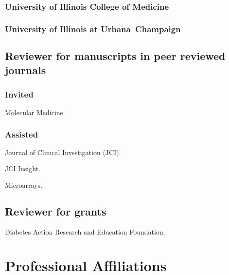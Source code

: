 \documentclass{komacv}
\begin{document}
\subsubsection{University of Illinois College of Medicine}

\subsubsection{University of Illinois at Urbana--Champaign}

\subsection{Reviewer for manuscripts in peer reviewed journals}
\subsubsection{Invited}
\begin{compactenum}
\item Molecular Medicine.
\end{compactenum}

\subsubsection{Assisted}
\begin{compactenum}
\item Journal of Clinical Investigation (JCI).
\item JCI Insight.
\item Microarrays.
\end{compactenum}

\subsection{Reviewer for grants}
\begin{compactenum}
\item Diabetes Action Research and Education Foundation.
\end{compactenum}

\section{Professional Affiliations}
\end{document}
